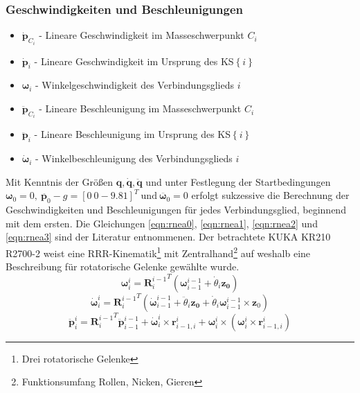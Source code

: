 \subsubsection*{Geschwindigkeiten und Beschleunigungen}
\begin{itemize}
	\item $ \dot{\boldsymbol{p}}_{C_i} $ - Lineare Geschwindigkeit im Masseschwerpunkt $ C_i $ 
	\item $ \dot{\boldsymbol{p}}_i $ - Lineare Geschwindigkeit im Ursprung des KS$\left\{i\right\}$
	\item $ \boldsymbol{\omega}_i $ - Winkelgeschwindigkeit des Verbindungsglieds $i$
	\item $ \ddot{\boldsymbol{p}}_{C_i} $ - Lineare Beschleunigung im Masseschwerpunkt $ C_i $
	\item $ \ddot{\boldsymbol{p}}_i $ - Lineare Beschleunigung im Ursprung des KS$\left\{i\right\}$
	\item $ \boldsymbol{\dot{\omega}}_i $ - Winkelbeschleunigung des Verbindungsglieds $i$
\end{itemize}
%
Mit Kenntnis der Größen $\bm{q}, \dot{\bm{q}}, \ddot{\bm{q}}$ und unter Festlegung der Startbedingungen $\bm{\omega}_0 = 0,~ \ddot{\bm{p}_0}-g = [0~0-9.81]^T~\text{und}~ \ddot{\bm{\omega}_0} = 0$  erfolgt sukzessive die Berechnung der Geschwindigkeiten und Beschleunigungen für jedes Verbindungsglied, beginnend mit dem ersten. 
Die Gleichungen \ref{eqn:rnea0}, \ref{eqn:rnea1}, \ref{eqn:rnea2} und  \ref{eqn:rnea3} sind der Literatur  \cite[S.~287~f.]{Grimble.2009} entnommenen. Der betrachtete KUKA KR210 R2700-2 weist eine RRR-Kinematik\footnote{Drei rotatorische Gelenke} mit Zentralhand\footnote{Funktionsumfang Rollen, Nicken, Gieren} auf weshalb eine Beschreibung für rotatorische Gelenke gewählte wurde.
%
\begin{equation}
	\label{eqn:rnea0}
	\bm{\omega}^i_i = {\bm{R}^{i-1}_i}^T  \left( \bm{\omega}^{i-1}_{i-1} +\dot{\theta}_i\bm{z_0} \right)
\end{equation}
%
\begin{equation}
	\label{eqn:rnea1}
	\dot{\bm{\omega}}^i_i = {\bm{R}^{i-1}_i}^T  \left( \dot{\bm{\omega}}^{i-1}_{i-1} +\ddot{\theta}_i\bm{z_0} +\dot{{\theta}}_i\bm{\omega}^{i-1}_{i-1} \times \bm{z}_0 \right)
\end{equation}
%
\begin{equation}
	\label{eqn:rnea2}
	\ddot{\bm{p}}^i_i = {\bm{R}^{i-1}_i}^T  \ddot{\bm{p}}^{i-1}_{i-1} + \dot{\bm{\omega}}^{i}_{i} \times \bm{r}^{i}_{i-1,i} + {\bm{\omega}}^{i}_{i} \times \left(  {\bm{\omega}}^{i}_{i} \times \bm{r}^{i}_{i-1,i} \right)
\end{equation}
